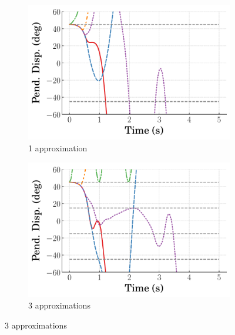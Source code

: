 \begin{figure}
    \centering
    \begin{subfigure}[b]{0.32\textwidth}
        \centering
        \includegraphics[width=\textwidth]{figures/figures_Interpretability/Mean_ISE_Inverted_Pendulum-v0_cubic_1_bins_near_equil/Curve_fit_time_responses/lumped_lqr/curve_fit_Pend_Disp_45.pdf}
        \caption{1 approximation}
        \label{subfig_chap5:lumped_LQR_near_equil_1_bins_resp_unclipped}
    \end{subfigure}
    \hfill
    \begin{subfigure}[b]{0.32\textwidth}
        \centering
        \includegraphics[width=\textwidth]{figures/figures_Interpretability/Mean_ISE_Inverted_Pendulum-v0_cubic_3_bins_near_equil/Curve_fit_time_responses/lumped_lqr/curve_fit_Pend_Disp_45.pdf}
        \caption{3 approximations}
        \label{subfig_chap5:lumped_LQR_near_equil_3_bins_resp_unclipped}

\end{subfigure}
\end{figure}
